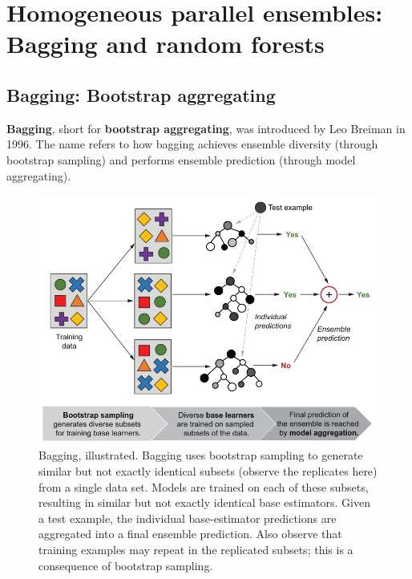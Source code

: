 \chapter{Homogeneous parallel ensembles: Bagging and random forests\label{Ch02}}
\section{Bagging: Bootstrap aggregating}
\textbf{Bagging}, short for \textbf{bootstrap aggregating}, was introduced by Leo Breiman in 1996. The
name refers to how bagging achieves ensemble diversity (through bootstrap sampling) and performs ensemble prediction (through model aggregating).
\begin{figure}
    \centering
    \includegraphics{../Figures/fig2-2.png}
    \caption{Bagging, illustrated. Bagging uses bootstrap sampling to generate similar but not exactly identical subsets (observe the replicates here) from a single data set. Models are trained on each of these subsets, resulting in similar but not exactly identical base estimators. Given a test example, the individual base-estimator predictions are aggregated into a final ensemble prediction. Also observe that training examples may repeat in the replicated subsets; this is a consequence of bootstrap sampling.}
\end{figure}


